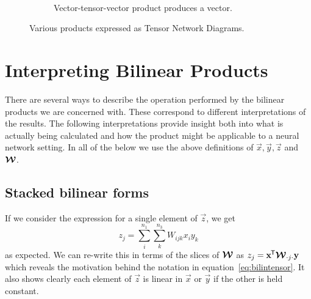 \begin{figure}
\begin{subfigure}[t]{0.45\textwidth}
	\end{subfigure} ~
	\begin{subfigure}[t]{0.45\textwidth}
		\centering
		\caption{Vector-tensor-vector product produces a vector.}
		\label{fig:vanillabilintnd}
	\end{subfigure}
	\caption{Various products expressed as Tensor Network Diagrams.}
	\label{fig:tnprods}
\end{figure}

\section{Interpreting Bilinear Products}\label{sec:tensorinterps}
There are several ways to describe the operation performed by the bilinear products we are
concerned with. These correspond to different interpretations of the results. The following
interpretations provide insight both into what is actually being calculated and how the product might
be applicable to a neural network setting. In all of the below we use the above definitions of
\(\vec{x}, \vec{y}, \vec{z}\) and \(\bm{\mathcal{W}}\).

\subsection{Stacked bilinear forms}
If we consider the expression for a single element of \(\vec{z}\), we get
\begin{equation} \label{eq:singlezsum}
	z_j = \sum_i^{n_1} \sum_k^{n_3} W_{ijk} x_i y_k
\end{equation} as expected. We can re-write this in terms of the slices of \(\bm{\mathcal{W}}\) as
\(\label{eq:singlezslice}
	z_j = \mathbf{x}^{\mkern-1.5mu\mathsf{T}}\bm{\mathcal{W}}_{\cdot j \cdot}\mathbf{y}
\) which reveals the motivation behind the notation in equation~\eqref{eq:bilintensor}.
It also shows clearly each element of \(\vec{z}\) is linear  in \(\vec{x}\) or \(\vec{y}\) if
the other is held constant.

